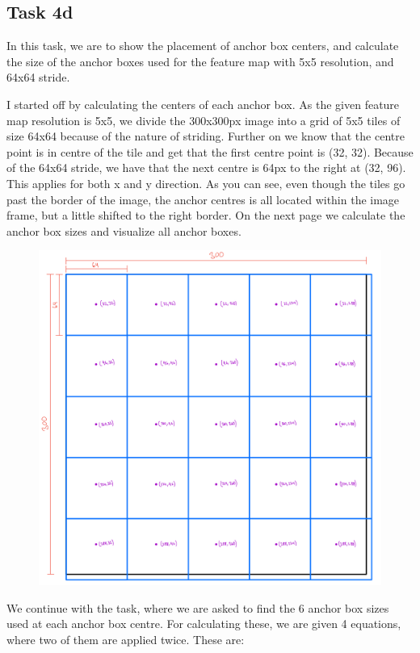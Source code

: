 \clearpage
\subsection*{Task 4d}
In this task, we are to show the placement of anchor box centers, and calculate the size of the anchor boxes used for the feature map with 5x5 resolution, and 64x64 stride.

I started off by calculating the centers of each anchor box.
As the given feature map resolution is 5x5, we divide the 300x300px image into a grid of 5x5 tiles of size 64x64 because of the nature of striding.
Further on we know that the centre point is in centre of the tile and get that the first centre point is (32, 32).
Because of the 64x64 stride, we have that the next centre is 64px to the right at (32, 96).
This applies for both x and y direction. 
As you can see, even though the tiles go past the border of the image, the anchor centres is all located within the image frame, but a little shifted to the right border.
On the next page we calculate the anchor box sizes and visualize all anchor boxes.

\begin{figure}[h!]
    \centering
    \includegraphics[width=\textwidth]{Images/task4d_illustration.png}
\end{figure}

\clearpage
We continue with the task, where we are asked to find the 6 anchor box sizes used at each anchor box centre.
For calculating these, we are given 4 equations, where two of them are applied twice. These are:

